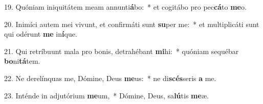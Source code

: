 19. Quóniam iniquitátem meam annunti\textbf{á}bo:~*  et cogitábo pro pec\textbf{cá}to \textbf{me}o.\

20. Inimíci autem mei vivunt, et confirmáti sunt \textbf{su}per me:~*  et multiplicáti sunt qui odérunt \textbf{me} in\textbf{í}que.\

21. Qui retríbuunt mala pro bonis, detrahébant \textbf{mi}hi:~*  quóniam sequébar \textbf{bo}ni\textbf{tá}tem.\

22. Ne derelínquas me, Dómine, Deus \textbf{me}us:~*  ne di\textbf{scés}seris \textbf{a} me.\

23. Inténde in adjutórium \textbf{me}um,~*  Dómine, Deus, sa\textbf{lú}tis \textbf{me}æ.\

